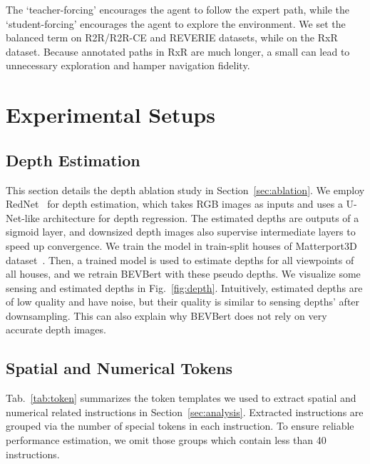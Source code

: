 The `teacher-forcing' encourages the agent to follow the expert path, while the `student-forcing' encourages the agent to explore the environment. 
We set the balanced term  on R2R/R2R-CE and REVERIE datasets, while  on the RxR dataset. Because annotated paths in RxR are much longer, a small  can lead to unnecessary exploration and hamper navigation fidelity.


\section{Experimental Setups}\label{sec:sup_exprs}




\subsection{Depth Estimation}
This section details the depth ablation study in Section~\ref{sec:ablation}. 
We employ RedNet~\cite{jiang2018rednet} for depth estimation, which takes RGB images as inputs and uses a U-Net-like architecture for depth regression.
The estimated depths are outputs of a sigmoid layer, and downsized depth images also supervise intermediate layers to speed up convergence. 
We train the model in train-split houses of Matterport3D dataset~\cite{chang2017matterport3d}.
Then, a trained model is used to estimate depths for all viewpoints of all houses, and we retrain BEVBert with these pseudo depths.
We visualize some sensing and estimated depths in Fig.~\ref{fig:depth}.
Intuitively, estimated depths are of low quality and have noise, but their quality is similar to sensing depths' after downsampling.
This can also explain why BEVBert does not rely on very accurate depth images.



\subsection{Spatial and Numerical Tokens}
Tab.~\ref{tab:token} summarizes the token templates we used to extract spatial and numerical related instructions in Section~\ref{sec:analysis}.
Extracted instructions are grouped via the number of special tokens in each instruction.
To ensure reliable performance estimation, we omit those groups which contain less than 40 instructions.

